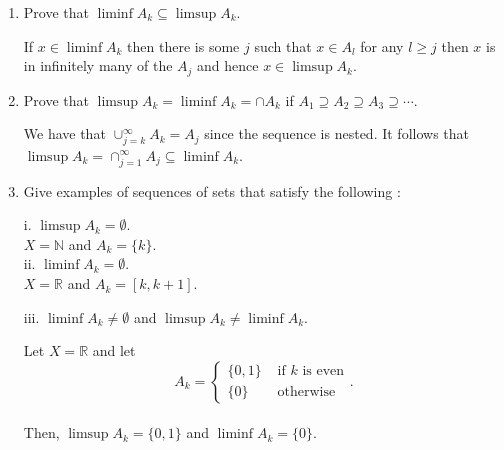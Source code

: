 \begin{enumerate}
\item Prove that $ \liminf A_k \subseteq \limsup A_k $.

\begin{pf}
If $ x \in \liminf A_k$ then there is some $j$ such that $x \in A_l$ for any $ l \geq j$ then $x$ is in infinitely many of the $A_j$ and hence $x \in \limsup A_k$. 
\end{pf}

\item Prove that $\limsup A_k = \liminf A_k = \cap A_k$ if $ A_1 \supseteq A_2 \supseteq A_3 \supseteq \cdots$.

\begin{pf}
We have that $ \cup_{j=k}^{\infty} A_k = A_j$ since the sequence is nested.  It follows that $ \limsup A_k = \cap_{j=1}^{\infty} A_j \subseteq \liminf A_k$.
\end{pf}

\item Give examples of sequences of sets that satisfy the following :
\begin{multicols}{3}
i. $\limsup A_k = \emptyset$.\\
 $X = \mathbb{N}$ and $A_k = \{ k \}$.\\

ii. $ \liminf A_k = \emptyset$.\\
\noindent $X = \mathbb{R}$ and $A_k = [k, k+1]$. 

iii. $ \liminf A_k \neq \emptyset$ and $ \limsup A_k \neq \liminf A_k$.

Let $X = \mathbb{R}$ and let \[ A_k = \begin{cases} \{ 0,1 \} & \mbox{ if } k \mbox{ is even} \\ \{ 0 \} & \mbox{ otherwise} \end{cases}. \] 
\\
Then, $\limsup A_k = \{ 0,1 \}$ and $ \liminf A_k = \{ 0 \}$.

\end{multicols}



\end{enumerate}





